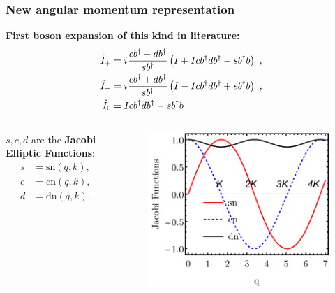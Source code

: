 \documentclass{beamer}
\newcommand{\iu}{{i\mkern1mu}}
\begin{document}
\begin{frame}
	\frametitle{New angular momentum representation}
	\vspace{-0.1cm}
	\textbf{First boson expansion of this kind in literature:}
	\begin{align}
		\hat{I}_+&=\iu\frac{cb^\dagger-db^\dagger}{sb^\dagger}\left(I+Icb^\dagger db^\dagger-sb^\dagger b\right)\ ,\nonumber\\
		\hat{I}_-&=\iu\frac{cb^\dagger+db^\dagger}{sb^\dagger}\left(I-Icb^\dagger db^\dagger+sb^\dagger b\right)\ ,\nonumber\\
		\hat{I}_0&=Icb^\dagger db^\dagger-sb^\dagger b\ .\nonumber
	\end{align}
	\vspace{-0.9cm}
	\begin{columns}
		\begin{column}{0.4\textwidth}
			$s,c,d$ are the \textbf{Jacobi Elliptic Functions}:\\
			\vspace{-0.5cm}
			\begin{align}
				s&=\text{sn}(q,k),\nonumber\\
				c&=\text{cn}(q,k),\nonumber\\
				d&=\text{dn}(q,k).\nonumber
			\end{align}
		\end{column}
		\begin{column}{0.6\textwidth}
			\begin{figure}
				\centering
				\includegraphics[scale=0.56]{figures/new-boson/Jacobi-Elliptic-Functions.pdf}
			\end{figure}
		\end{column}
	\end{columns}
\end{frame}
\end{document}
